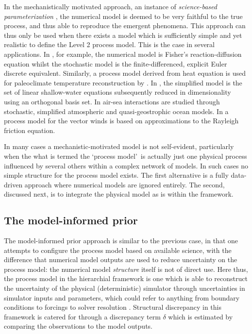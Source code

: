 \documentclass[10pt,a4paper]{article}
\begin{document}
In the mechanistically motivated approach, an instance of \emph{science-based parameterization} \citep{Leeds_2012}, the numerical model is deemed to be very faithful to the true process, and thus able to reproduce the emergent phenomena. This approach can thus only be used when there exists a model which is sufficiently simple and yet realistic to define the Level 2 process model. This is the case in several applications.  In \cite{Hooten_2008}, for example, the numerical model is Fisher's reaction-diffusion equation whilst the stochastic model is the finite-differenced, explicit Euler discrete equivalent. Similarly, a process model derived from heat equation is used for paleoclimate temperature reconstruction by \cite{Brynjarsdottir_2011}. In \cite{Wikle_2001}, the simplified model is the set of linear shallow-water equations subsequently reduced in dimensionality using an orthogonal basis set. In \cite{Berliner_2003b} air-sea interactions are studied through stochastic, simplified atmospheric and quasi-geostrophic ocean models. In \cite{Milliff_2011} a process model for the vector winds is based on approximations to the Rayleigh friction equation. 


In many cases a mechanistic-motivated model is not self-evident, particularly when the what is termed the \lq process model\rq~is actually just one physical process influenced by several others within a complex network of models. In such cases no simple structure for the process model exists. The first alternative is a fully data-driven approach where numerical models are ignored entirely. The second, discussed next, is to integrate the physical model as is within the framework.


\subsection{The model-informed prior}

The model-informed prior approach is similar to the previous case, in that one attempts to configure the process model based on available science, with the difference that numerical model outputs are used to reduce uncertainty on the process model: the numerical model \emph{structure} itself is not of direct use.  Here thus, the process model in the hierarchial framework is one which is able to reconstruct the uncertainty of the physical (deterministic) simulator through uncertainties in simulator inputs and parameters, which could refer to anything from boundary conditions to forcings to solver resolution \citep{Goldstein_2009}. Structural discrepancy in this framework is catered for through a discrepancy term $\delta$ which is estimated by comparing the observations to the model outputs.
\end{document}
